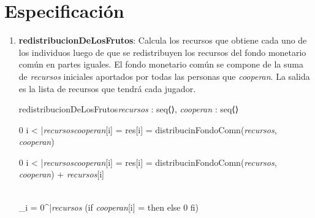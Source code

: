 \documentclass[10pt,a4paper]{article}
\begin{document}
\section{Especificación} 

\begin{enumerate}
    \item \textbf{redistribucionDeLosFrutos}: Calcula los recursos que obtiene cada uno de los individuos luego de que se redistribuyen
    los recursos del fondo monetario común en partes iguales. El fondo monetario común se compone de la suma de \textit{recursos} iniciales aportados por todas las personas que \textit{cooperan}. La salida es la lista de recursos que tendrá cada jugador.

    \begin{proc}{redistribucionDeLosFrutos}{\In \textit{recursos} : seq⟨\real⟩, \In \textit{cooperan} : }
    {seq⟨\real⟩}



    \end{proc}
    

    {
    {0 \leq i < |{\textit{recursos}}\vert \y  \textit{cooperan}[i] = \True \implicaLuego res[i] = 
    distribucinFondoComn(\textit{recursos}, \textit{cooperan})}}
    
    {
    {0 \leq i < |{\textit{recursos}}\vert \y  \textit{cooperan}[i] = \False \implicaLuego res[i] = 
    distribucinFondoComn(\textit{recursos}, \textit{cooperan}) + \textit{recursos}[i]}}

    {\\\sum_{i = 0}^{|{\textit{recursos}}} 
    (if \hspace{2mm} \textit{cooperan}[i] = \True \hspace{2mm} then \hspace{2mm}  \hspace{2mm} else \hspace{2mm} 0 \hspace{2mm} fi)}
    


\end{enumerate}
\end{document}
